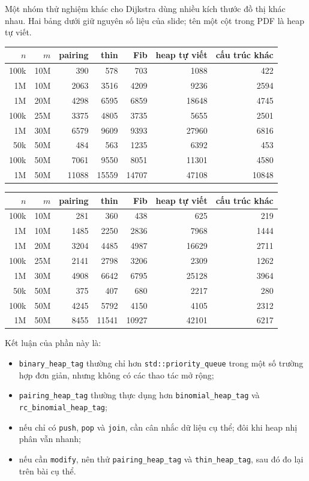 \documentclass[11pt]{article}
\begin{document}
Một nhóm thử nghiệm khác cho Dijkstra dùng nhiều kích thước đồ thị khác nhau.
Hai bảng dưới giữ nguyên số liệu của slide; tên một cột trong PDF là heap tự
viết.

\begin{center}
\small
\begin{tabular}{|r|r|r|r|r|r|r|}
\hline
$n$ & $m$ & pairing & thin & Fib & heap tự viết & cấu trúc khác \\
\hline
100k & 10M & 390 & 578 & 703 & 1088 & 422 \\
1M & 10M & 2063 & 3516 & 4209 & 9236 & 2594 \\
1M & 20M & 4298 & 6595 & 6859 & 18648 & 4745 \\
100k & 25M & 3375 & 4805 & 3735 & 5655 & 2501 \\
1M & 30M & 6579 & 9609 & 9393 & 27960 & 6816 \\
50k & 50M & 484 & 563 & 1235 & 6392 & 453 \\
100k & 50M & 7061 & 9550 & 8051 & 11301 & 4580 \\
1M & 50M & 11088 & 15559 & 14707 & 47108 & 10848 \\
\hline
\end{tabular}
\end{center}

\begin{center}
\small
\begin{tabular}{|r|r|r|r|r|r|r|}
\hline
$n$ & $m$ & pairing & thin & Fib & heap tự viết & cấu trúc khác \\
\hline
100k & 10M & 281 & 360 & 438 & 625 & 219 \\
1M & 10M & 1485 & 2250 & 2836 & 7968 & 1444 \\
1M & 20M & 3204 & 4485 & 4987 & 16629 & 2711 \\
100k & 25M & 2141 & 2798 & 3206 & 2309 & 1262 \\
1M & 30M & 4908 & 6642 & 6795 & 25128 & 3964 \\
50k & 50M & 375 & 407 & 680 & 2217 & 280 \\
100k & 50M & 4245 & 5792 & 4150 & 4105 & 2312 \\
1M & 50M & 8455 & 11541 & 10927 & 42101 & 6217 \\
\hline
\end{tabular}
\end{center}

Kết luận của phần này là:
\begin{itemize}
  \item \texttt{binary\_heap\_tag} thường chỉ hơn \texttt{std::priority\_queue}
  trong một số trường hợp đơn giản, nhưng không có các thao tác mở rộng;
  \item \texttt{pairing\_heap\_tag} thường thực dụng hơn
  \texttt{binomial\_heap\_tag} và \texttt{rc\_binomial\_heap\_tag};
  \item nếu chỉ có \texttt{push}, \texttt{pop} và \texttt{join}, cần cân nhắc
  dữ liệu cụ thể; đôi khi heap nhị phân vẫn nhanh;
  \item nếu cần \texttt{modify}, nên thử \texttt{pairing\_heap\_tag} và
  \texttt{thin\_heap\_tag}, sau đó đo lại trên bài cụ thể.
\end{itemize}
\end{document}
